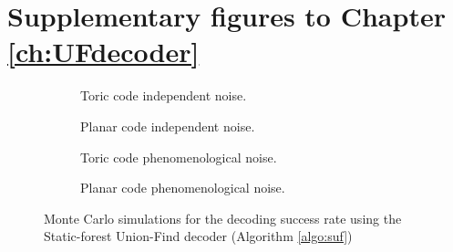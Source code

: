 \chapter{Supplementary figures to Chapter \ref{ch:UFdecoder}}\label{ap:figuf}

\begin{figure}[htbp]
  \centering
  \begin{subfigure}[b]{0.49\textwidth}
      \begin{adjustbox}{Clip=0 1em 0 0}
        
      \end{adjustbox}
      \caption{Toric code independent noise.}
  \end{subfigure}
  \begin{subfigure}[b]{0.49\textwidth}
      \begin{adjustbox}{Clip=0 1em 0 0}
        
      \end{adjustbox}
      \caption{Planar code independent noise.}
  \end{subfigure}
  \begin{subfigure}[b]{0.49\textwidth}
      \begin{adjustbox}{Clip=0 1em 0 0}
        
      \end{adjustbox}
      \caption{Toric code phenomenological noise.}
  \end{subfigure}
  \begin{subfigure}[b]{0.49\textwidth}
      \begin{adjustbox}{Clip=0 1em 0 0}
        
      \end{adjustbox}
      \caption{Planar code phenomenological noise.}
  \end{subfigure}
  \caption{Monte Carlo simulations for the decoding success rate using the Static-forest Union-Find decoder (Algorithm \ref{algo:suf})}
  \label{fig:threshold_suf}
\end{figure}

